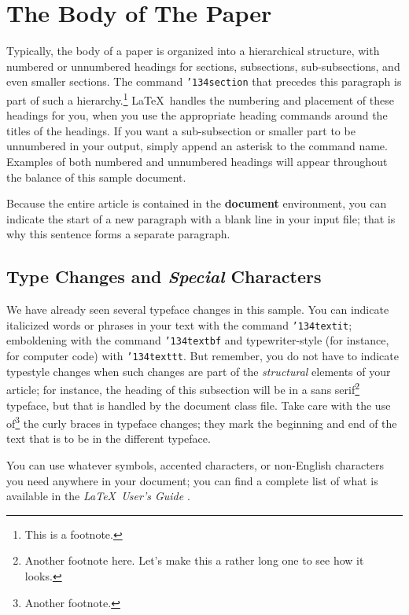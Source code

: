 \section{The Body of The Paper}
Typically, the body of a paper is organized into a hierarchical
structure, with numbered or unnumbered headings for sections,
subsections, sub-subsections, and even smaller sections.  The command
\texttt{{\char'134}section} that precedes this paragraph is part of
such a hierarchy.\footnote{This is a footnote.} \LaTeX\ handles the
numbering and placement of these headings for you, when you use the
appropriate heading commands around the titles of the headings.  If
you want a sub-subsection or smaller part to be unnumbered in your
output, simply append an asterisk to the command name.  Examples of
both numbered and unnumbered headings will appear throughout the
balance of this sample document.

Because the entire article is contained in the \textbf{document}
environment, you can indicate the start of a new paragraph with a
blank line in your input file; that is why this sentence forms a
separate paragraph.

\subsection{Type Changes and {\itshape Special} Characters}

We have already seen several typeface changes in this sample.  You can
indicate italicized words or phrases in your text with the command
\texttt{{\char'134}textit}; emboldening with the command
\texttt{{\char'134}textbf} and typewriter-style (for instance, for
computer code) with \texttt{{\char'134}texttt}.  But remember, you do
not have to indicate typestyle changes when such changes are part of
the \textit{structural} elements of your article; for instance, the
heading of this subsection will be in a sans serif\footnote{Another
  footnote here.  Let's make this a rather long one to see how it
  looks.} typeface, but that is handled by the document class file.
Take care with the use of\footnote{Another footnote.}  the
curly braces in typeface changes; they mark the beginning and end of
the text that is to be in the different typeface.

You can use whatever symbols, accented characters, or non-English
characters you need anywhere in your document; you can find a complete
list of what is available in the \textit{\LaTeX\ User's Guide}
\cite{Lamport:LaTeX}.


